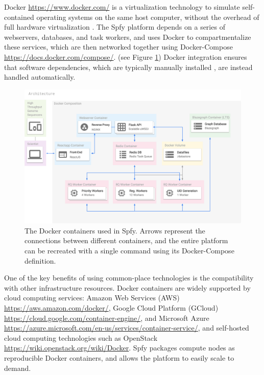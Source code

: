 \documentclass{article}
\begin{document}
Docker \url{https://www.docker.com/} is a virtualization technology to simulate self-contained operating systems on the same host computer, without the overhead of full hardware virtualization \cite{felter2015updated}.
The Spfy platform depends on a series of webservers, databases, and task workers, and uses Docker to compartmentalize these services, which are then networked together using Docker-Compose \url{https://docs.docker.com/compose/}.
(see Figure \ref{fig-docker})
Docker integration ensures that software dependencies, which are typically manually installed \cite{doi:10.1093/bioinformatics/btu153,laing2010pan,inouye2014srst2,naccache2014cloud}, are instead handled automatically.

\begin{figure}[!hb]
\begin{center}
\includegraphics[width=\textwidth]{images/docker}
\end{center}
\caption{The Docker containers used in Spfy. Arrows represent the connections between different containers, and the entire platform can be recreated with a single command using its Docker-Compose definition.}
\label{fig-docker}
\end{figure}

One of the key benefits of using common-place technologies is the compatibility with other infrastructure resources.
Docker containers are widely supported by cloud computing services: Amazon Web Services (AWS) \url{https://aws.amazon.com/docker/}, Google Cloud Platform (GCloud) \url{https://cloud.google.com/container-engine/}, and Microsoft Azure \url{https://azure.microsoft.com/en-us/services/container-service/}, and self-hosted cloud computing technologies such as OpenStack \url{https://wiki.openstack.org/wiki/Docker}.
Spfy packages compute nodes as reproducible Docker containers, and allows the platform to easily scale to demand.
\end{document}
